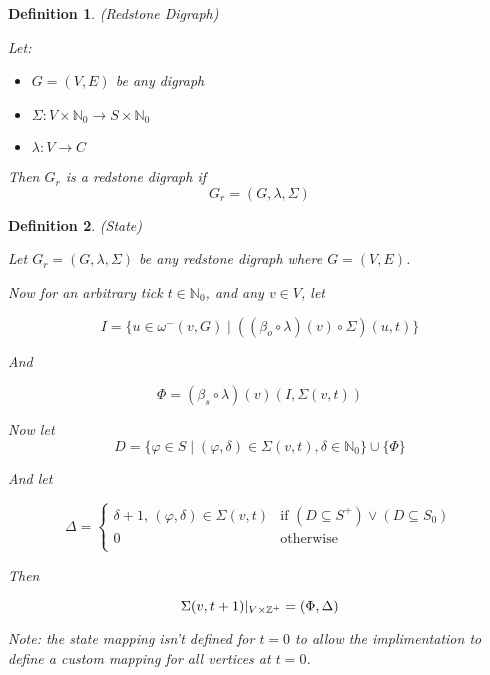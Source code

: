 \documentclass{article}
\newtheorem{defn}{Definition}[section]
\begin{document}
\medskip

\begin{defn} (Redstone Digraph)
	
	Let:
	
	\begin{itemize}
		\item \(G = (V, E)\) be any digraph
		\item \(\Sigma : V \times \mathbb{N}_{0} \to S \times \mathbb{N}_{0}\)
		\item \(\lambda : V \to C\)
	\end{itemize}

	Then \(G_{r}\) is a redstone digraph if 
	\begin{equation}
	G_{r} = (G, \lambda, \Sigma)
	\end{equation}
	
\end{defn}
	
\begin{defn} (State)

Let \(G_{r} = (G, \lambda, \Sigma)\) be any redstone digraph where \(G = (V, E)\).

Now for an arbitrary tick \(t \in \mathbb{N}_{0}\), and any \(v \in V\), let

\begin{equation*}
	I = \{ u \in \omega^-(v, G) \mid ((\beta_{o} \circ \lambda)(v) \circ \Sigma)(u, t) \}
\end{equation*}

And

\begin{equation}
	\Phi = (\beta_{s} \circ \lambda)(v)(I, \Sigma(v, t))
\end{equation}

Now let 
\begin{equation}
	D = \{\varphi \in S \mid (\varphi, \delta) \in \Sigma(v, t), \delta \in \mathbb{N}_{0}\} \cup \{\Phi\}
\end{equation}

And let

\begin{equation}
	\Delta = 
	\begin{cases}
		\delta + 1,\, (\varphi, \delta) \in \Sigma(v, t) & \text{if } (D \subseteq S^+) \vee (D \subseteq S_{0})\\	
		0 & \text{otherwise} \\	
	\end{cases}
\end{equation}

Then

\begin{equation}
	\Sigma(v, t + 1)|_{V \times \mathbb{Z}^+} = (\Phi, \Delta) \\
\end{equation}

Note: the state mapping isn't defined for \(t = 0\) to allow the implimentation to define a custom mapping for all 
vertices at \(t = 0\).

\end{defn}
\end{document}
